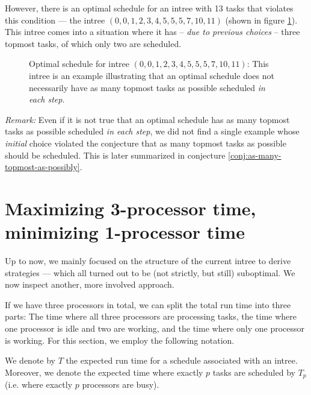 However, there is an optimal schedule for an intree with 13 tasks that violates this condition ---  the intree $(0,0,1,2,3,4,5,5,5,7,10,11)$ (shown in figure \ref{fig:as-many-topmost-tasks-as-possible-false}). This intree comes into a situation where it has -- \emph{due to previous choices} -- three topmost tasks, of which only two are scheduled.

\begin{figure}[th]
  \centering
  
  \caption{Optimal schedule for intree $(0,0,1,2,3,4,5,5,5,7,10,11)$: This intree is an example illustrating that an optimal schedule does not necessarily have as many topmost tasks as possible scheduled \emph{in each step}.}
  \label{fig:as-many-topmost-tasks-as-possible-false}
\end{figure}

\emph{Remark:} Even if it is not true that an optimal schedule has as many topmost tasks as possible scheduled \emph{in each step}, we did not find a single example whose \emph{initial} choice violated the conjecture that as many topmost tasks as possible should be scheduled. This is later summarized in conjecture \ref{conj:as-many-topmost-as-possibly}.

\section{Maximizing 3-processor time, minimizing 1-processor time}
\label{sec:p3-disproving-long-p3-and-short-p1-time}

Up to now, we mainly focused on the structure of the current intree to derive strategies --- which all turned out to be (not strictly, but still) suboptimal. We now inspect another, more involved approach.

If we have three processors in total, we can split the total run time into three parts: The time where all three processors are processing tasks, the time where one processor is idle and two are working, and the time where only one processor is working. For this section, we employ the following notation.


\begin{definition}
  We denote by $T$ the expected run time for a schedule associated with an intree. 
  Moreover, we denote the expected time where exactly $p$ tasks are scheduled by $T_p$ (i.e. where exactly $p$ processors are busy).
\end{definition}

